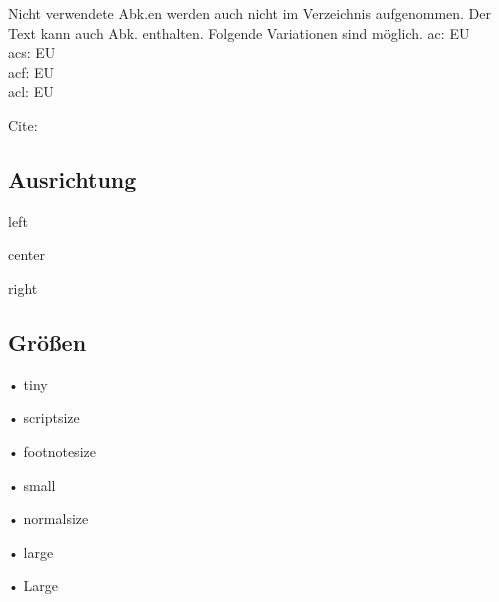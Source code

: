 Nicht verwendete \ac{Abk.}en werden auch nicht im Verzeichnis aufgenommen. Der Text kann auch \ac{Abk.} enthalten. Folgende Variationen sind möglich.\linebreak
ac: \ac{EU}\\
acs: \acs{EU}\\
acf: \acf{EU}\\
acl: \acl{EU}\\ \par

Cite: %

\subsection{Ausrichtung}\label{ssec:ausrichtung}

\begin{flushleft}
left
\end{flushleft}

\begin{center}
center
\end{center}

\begin{flushright}
right
\end{flushright}

\subsection{Grö{\ss}en}\label{ssec:groessen}

\begin{tiny}
• tiny
\end{tiny}

\begin{scriptsize}
• scriptsize
\end{scriptsize}

\begin{footnotesize}
• footnotesize
\end{footnotesize}

\begin{small}
• small
\end{small}

\begin{normalsize}
• normalsize
\end{normalsize}

\begin{large}
• large
\end{large}

\begin{Large}
• Large
\end{Large}


